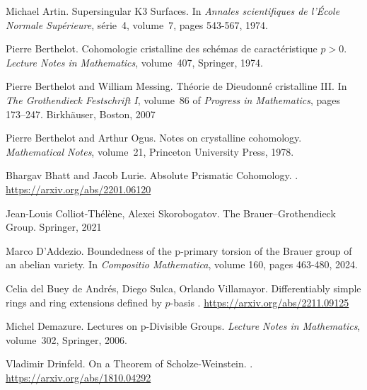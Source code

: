 \documentclass[11pt]{article}
\theoremstyle{plain}
\theoremstyle{definition}
\theoremstyle{remark}
\numberwithin{equation}{section}
\begin{document}
\begin{thebibliography}{9999}


Michael Artin.
\newblock Supersingular K$3$ Surfaces.
\newblock In {\em Annales scientifiques de l'École Normale Supérieure}, série~4, volume~7, pages 543-567, 1974.

Pierre Berthelot.
\newblock Cohomologie cristalline des sch\'{e}mas de caractéristique $p>0$.
\newblock \textit{Lecture Notes in Mathematics}, volume~407, Springer, 1974.

Pierre Berthelot and William Messing.
\newblock Th{\'e}orie de Dieudonn{\'e} cristalline III.
\newblock In {\em The Grothendieck Festschrift I}, volume~86 of 
{\em Progress in Mathematics}, pages 173--247. Birkh{\"a}user, Boston, 2007

Pierre Berthelot and Arthur Ogus.
\newblock Notes on crystalline cohomology.
\newblock \textit{Mathematical Notes}, volume~21, Princeton University Press, 1978.

Bhargav Bhatt and Jacob Lurie.
\newblock Absolute Prismatic Cohomology.
.
\newblock \url{https://arxiv.org/abs/2201.06120}

Jean-Louis Colliot-Thélène, Alexei Skorobogatov.
\newblock The Brauer–Grothendieck Group.
\newblock Springer, 2021

Marco D'Addezio.
\newblock Boundedness of the p-primary torsion of the Brauer group of an abelian variety.
\newblock In {\em Compositio Mathematica}, volume 160, pages 463-480, 2024.

Celia del Buey de Andrés, Diego Sulca, Orlando Villamayor.
\newblock Differentiably simple rings and ring extensions defined by $p$-basis
.
\newblock \url{https://arxiv.org/abs/2211.09125}

Michel Demazure.
\newblock Lectures on p-Divisible Groups.
\newblock \textit{Lecture Notes in Mathematics}, volume~302, Springer, 2006.

Vladimir Drinfeld.
\newblock On a Theorem of Scholze-Weinstein.
.
\newblock \url{https://arxiv.org/abs/1810.04292}


\end{thebibliography}
\end{document}
